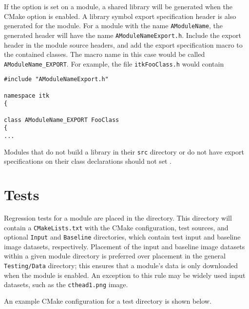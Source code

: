 If the  option is set on a
module, a shared library will be generated when
the CMake option  is enabled.  A library symbol
export specification header is also generated for the module.  For a module
with the name \texttt{AModuleName}, the generated header will have the name
\texttt{AModuleNameExport.h}. Include the export header in the module source
headers, and add the export specification macro to the contained classes.  The
macro name in this case would be called \texttt{AModuleName\_EXPORT}. For
example, the file \texttt{itkFooClass.h} would contain

\begin{verbatim}
#include "AModuleNameExport.h"

namespace itk
{

class AModuleName_EXPORT FooClass
{
...
\end{verbatim}

Modules that do not build a library in their \texttt{src} directory or do not
have export specifications on their class declarations should not set
.


\section{Tests}
\label{sec:Tests}

Regression tests for a module are placed in the  directory. This
directory will contain a \texttt{CMakeLists.txt} with the CMake configuration,
test sources, and optional \texttt{Input} and \texttt{Baseline} directories,
which contain test input and baseline image datasets, respectively. Placement
of the input and baseline image datasets within a given module directory is
preferred over placement in the general \texttt{Testing/Data} directory; this
ensures that a module's data is only downloaded when the module is enabled. An
exception to this rule may be widely used input datasets, such as the
\texttt{cthead1.png} image.

An example CMake configuration for a test directory is shown below.

